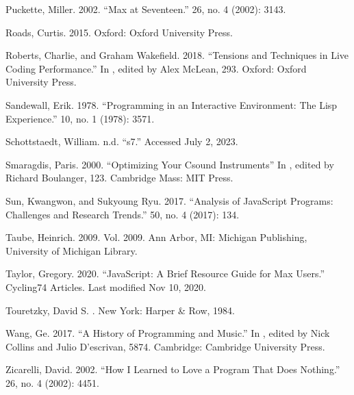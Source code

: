 \documentclass[letterpaper,10pt,english]{sphinxmanual}
\begin{document}
\sphinxAtStartPar
Puckette, Miller. 2002. “Max at Seventeen.”  26, no. 4 (2002): 31\textendash{}43.

\sphinxAtStartPar
Roads, Curtis. 2015.  Oxford: Oxford University Press.

\sphinxAtStartPar
Roberts, Charlie, and Graham Wakefield. 2018. “Tensions and Techniques in Live Coding Performance.” In , edited by Alex McLean, 293. Oxford: Oxford University Press.

\sphinxAtStartPar
Sandewall, Erik. 1978. “Programming in an Interactive Environment: The Lisp Experience.”  10, no. 1 (1978): 35\textendash{}71.

\sphinxAtStartPar
Schottstaedt, William. n.d. “s7.” Accessed July 2, 2023. 

\sphinxAtStartPar
Smaragdis, Paris. 2000. “Optimizing Your Csound Instruments” In , edited by Richard Boulanger, 123. Cambridge Mass: MIT Press.

\sphinxAtStartPar
Sun, Kwangwon, and Sukyoung Ryu. 2017. “Analysis of JavaScript Programs: Challenges and Research Trends.”  50, no. 4 (2017): 1\textendash{}34.

\sphinxAtStartPar
Taube, Heinrich. 2009.  Vol. 2009. Ann Arbor, MI: Michigan Publishing, University of Michigan Library.

\sphinxAtStartPar
Taylor, Gregory. 2020. “JavaScript: A Brief Resource Guide for Max Users.” Cycling74 Articles. Last modified Nov 10, 2020. 

\sphinxAtStartPar
Touretzky, David S. . New York: Harper \& Row, 1984.

\sphinxAtStartPar
Wang, Ge. 2017. “A History of Programming and Music.” In , edited by Nick Collins and Julio D’escrivan, 58\sphinxhyphen{}74. Cambridge: Cambridge University Press.

\sphinxAtStartPar
Zicarelli, David. 2002. “How I Learned to Love a Program That Does Nothing.”  26, no. 4 (2002): 44\textendash{}51.



\renewcommand{\indexname}{Index}
\printindex
\end{document}
